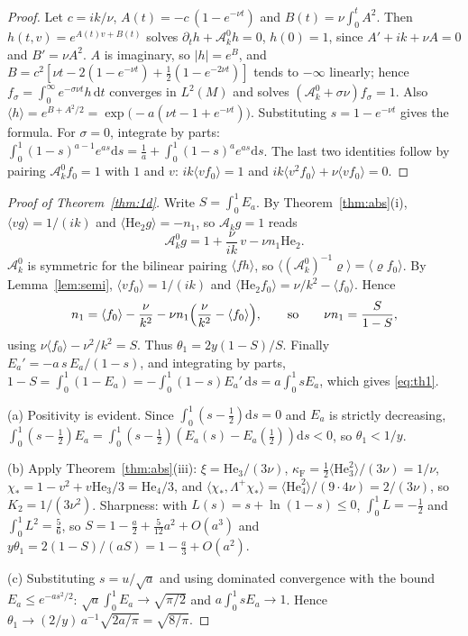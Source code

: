 \documentclass[11pt]{article}
\newcommand{\dd}{\mathrm{d}}
\newcommand{\He}{\mathrm{He}}
\newcommand{\cA}{\mathcal{A}}
\newcommand{\avg}[1]{\langle #1\rangle}
\theoremstyle{remark}
\begin{document}
\begin{proof}
Let $c=ik/\nu$, $A(t)=-c\,(1-e^{-\nu t})$ and $B(t)=\nu\int_0^tA^2$. Then
$h(t,v)=e^{A(t)v+B(t)}$ solves $\partial_th+\cA^0_kh=0$, $h(0)=1$, since
$A'+ik+\nu A=0$ and $B'=\nu A^2$. $A$ is imaginary, so $|h|=e^{B}$, and
$B=c^2[\nu t-2(1-e^{-\nu t})+\tfrac12(1-e^{-2\nu t})]$ tends to $-\infty$
linearly; hence $f_\sigma=\int_0^\infty e^{-\sigma\nu t}h\,\dd t$ converges
in $L^2(M)$ and solves $(\cA^0_k+\sigma\nu)f_\sigma=1$. Also
$\avg{h}=e^{B+A^2/2}=\exp\bigl(-a(\nu t-1+e^{-\nu t})\bigr)$. Substituting
$s=1-e^{-\nu t}$ gives the formula. For $\sigma=0$, integrate by parts:
$\int_0^1(1-s)^{a-1}e^{as}\dd s=\tfrac1a+\int_0^1(1-s)^ae^{as}\dd s$. The
last two identities follow by pairing $\cA^0_kf_0=1$ with $1$ and $v$:
$ik\avg{vf_0}=1$ and $ik\avg{v^2f_0}+\nu\avg{vf_0}=0$.
\end{proof}

\begin{proof}[Proof of Theorem~\ref{thm:1d}]
Write $S=\int_0^1E_a$. By Theorem~\ref{thm:abs}(i),
$\avg{vg}=1/(ik)$ and $\avg{\He_2g}=-n_1$, so $\cA_kg=1$ reads
\[
  \cA^0_kg = 1+\frac{\nu}{ik}\,v-\nu n_1\He_2 .
\]
$\cA^0_k$ is symmetric for the bilinear pairing $\avg{fh}$, so
$\avg{(\cA^0_k)^{-1}\varrho} = \avg{\varrho f_0}$. By Lemma~\ref{lem:semi},
$\avg{vf_0}=1/(ik)$ and $\avg{\He_2f_0}=\nu/k^2-\avg{f_0}$. Hence
\[
  n_1 = \avg{f_0}-\frac{\nu}{k^2}-\nu n_1\Bigl(\frac{\nu}{k^2}-\avg{f_0}\Bigr),
  \qquad\text{so}\qquad \nu n_1 = \frac{S}{1-S},
\]
using $\nu\avg{f_0}-\nu^2/k^2=S$. Thus $\theta_1=2y(1-S)/S$. Finally
$E_a' = -a\,s\,E_a/(1-s)$, and integrating by parts,
$1-S=\int_0^1(1-E_a) = -\int_0^1(1-s)E_a'\,\dd s = a\int_0^1sE_a$, which
gives \eqref{eq:th1}.

(a) Positivity is evident. Since $\int_0^1(s-\tfrac12)\dd s=0$ and $E_a$ is
strictly decreasing,
$\int_0^1(s-\tfrac12)E_a = \int_0^1(s-\tfrac12)(E_a(s)-E_a(\tfrac12))\dd s<0$,
so $\theta_1<1/y$.

(b) Apply Theorem~\ref{thm:abs}(iii): $\xi=\He_3/(3\nu)$,
$\kappa_{\mathrm F}=\tfrac12\avg{\He_3^2}/(3\nu)=1/\nu$,
$\chi_*=1-v^2+v\He_3/3=\He_4/3$, and
$\avg{\chi_*,\Lambda^+\chi_*}=\avg{\He_4^2}/(9\cdot4\nu)=2/(3\nu)$, so
$K_2=1/(3\nu^2)$. Sharpness: with $L(s)=s+\ln(1-s)\le0$,
$\int_0^1L=-\tfrac12$ and $\int_0^1L^2=\tfrac56$, so
$S=1-\tfrac a2+\tfrac{5}{12}a^2+O(a^3)$ and
$y\theta_1=2(1-S)/(aS)=1-\tfrac a3+O(a^2)$.

(c) Substituting $s=u/\sqrt a$ and using dominated convergence with the
bound $E_a\le e^{-as^2/2}$: $\sqrt a\int_0^1E_a\to\sqrt{\pi/2}$ and
$a\int_0^1sE_a\to1$. Hence
$\theta_1\to(2/y)\,a^{-1}\sqrt{2a/\pi}=\sqrt{8/\pi}$.
\end{proof}
\end{document}
